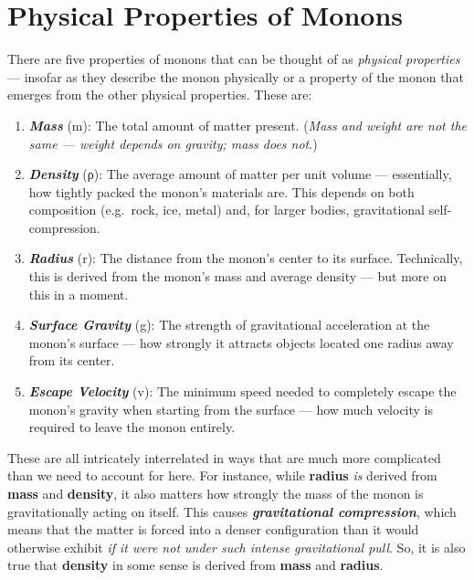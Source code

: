 \documentclass[
  letterpaper,
]{book}
\providecommand{\tightlist}{%
  \setlength{\itemsep}{0pt}\setlength{\parskip}{0pt}}
\begin{document}
\section{Physical Properties of
Monons}\label{physical-properties-of-monons}

There are five properties of monons that can be thought of as
\emph{physical properties} --- insofar as they describe the monon
physically or a property of the monon that emerges from the other
physical properties. These are:

\begin{enumerate}
\def\labelenumi{\arabic{enumi}.}
\tightlist
\item
  \textbf{\emph{Mass}} (m): The total amount of matter present.
  (\emph{Mass and weight are not the same --- weight depends on gravity;
  mass does not}.)
\item
  \textbf{\emph{Density}} (ρ): The average amount of matter per unit
  volume --- essentially, how tightly packed the monon's materials are.
  This depends on both composition (e.g.~rock, ice, metal) and, for
  larger bodies, gravitational self-compression.
\item
  \textbf{\emph{Radius}} (r): The distance from the monon's center to
  its surface. Technically, this is derived from the monon's mass and
  average density --- but more on this in a moment.
\item
  \textbf{\emph{Surface Gravity}} (g): The strength of gravitational
  acceleration at the monon's surface --- how strongly it attracts
  objects located one radius away from its center.
\item
  \textbf{\emph{Escape Velocity}} (v): The minimum speed needed to
  completely escape the monon's gravity when starting from the surface
  --- how much velocity is required to leave the monon entirely.
\end{enumerate}

These are all intricately interrelated in ways that are much more
complicated than we need to account for here. For instance, while
\textbf{radius} \emph{is} derived from \textbf{mass} and
\textbf{density}, it also matters how strongly the mass of the monon is
gravitationally acting on itself. This causes
\textbf{\emph{gravitational compression}}, which means that the matter
is forced into a denser configuration than it would otherwise exhibit
\emph{if it were not under such intense gravitational pull}. So, it is
also true that \textbf{density} in some sense is derived from
\textbf{mass} and \textbf{radius}.
\end{document}
